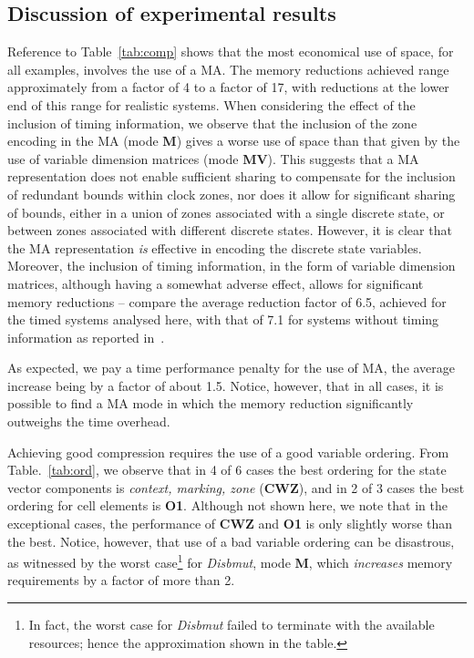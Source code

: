 \subsection{Discussion of experimental results}
Reference to Table~\ref{tab:comp} shows that the most economical use
of space, for all examples, involves the use of a MA. The memory
reductions achieved range approximately from a factor of 4 to a factor
of 17, with reductions at the lower end of this range for realistic systems.
When considering the effect of the inclusion of timing information,
we observe that the inclusion of the zone encoding in the MA (mode
{\bfseries M}) gives a worse use of space than
that given by the use of variable dimension matrices (mode {\bfseries
MV}). This suggests that a MA
representation does not enable sufficient sharing to compensate for the
inclusion of redundant bounds within clock zones, nor does it
allow for significant sharing of bounds, either in a union of zones
associated with a single discrete state, or between zones associated
with different discrete states. However, it is clear that the MA
representation \emph{is} effective in encoding the discrete state
variables. Moreover, the inclusion of timing information, in the form of
variable dimension matrices, although
having a somewhat adverse effect, allows for significant memory
reductions -- compare the average reduction factor of 6.5, achieved
for the timed systems analysed here, with that of 7.1 for systems
without timing information as reported in~\cite{hp:99}.

As expected, we pay a time performance penalty for the use of MA, the
average increase being by a factor of about 1.5. Notice, however, that in all
cases, it is possible to find a MA mode in which the memory reduction
significantly outweighs the time overhead.

Achieving good compression requires the use of a good variable
ordering. From Table.~\ref{tab:ord}, we observe that in 4 of 6 cases
the best ordering for the state vector components is
\emph{context, marking, zone} ({\bfseries CWZ}), and in 2 of 3 cases
the best ordering for cell elements is {\bfseries O1}. Although not
shown here, we note that in the exceptional cases, the performance
of {\bfseries CWZ} and {\bfseries O1} is only slightly worse than the
best. Notice, however, that use of a bad variable ordering can be
disastrous, as witnessed by the worst case\footnote{In fact, the worst
case for \emph{Disbmut} failed to terminate with the available resources;
hence the approximation shown in the table.} for \emph{Disbmut}, mode
{\bfseries M}, which \emph{increases} memory requirements by a factor of more
than 2.


